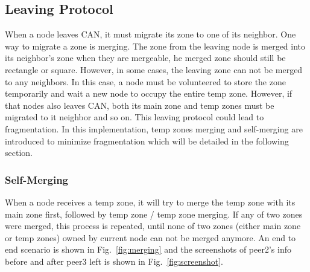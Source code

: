 \documentclass[11pt, oneside]{article}   	%
\begin{document}
\subsection{Leaving Protocol}
When a node leaves CAN, it must migrate its zone to one of its neighbor. One way to migrate a zone is merging. The zone from the leaving node is merged into its neighbor's zone when they are mergeable, he merged zone should still be rectangle or square. However, in some cases, the leaving zone can not be merged to any neighbors. In this case, a node must be volunteered to store the zone temporarily and wait a new node to occupy the entire temp zone. However, if that nodes also leaves CAN, both its main zone and temp zones must be migrated to it neighbor and so on. This leaving protocol could lead to fragmentation. In this implementation, temp zones merging and self-merging are introduced to minimize fragmentation which will be detailed in the following section.

\subsubsection{Self-Merging}
When a node receives a temp zone, it will try to merge the temp zone with its main zone first, followed by temp zone / temp zone merging. If any of two zones were merged, this process is repeated, until none of two zones (either main zone or temp zones) owned by current node can not be merged anymore. An end to end scenario is shown in Fig.~\ref{fig:merging} and the screenshots of peer2's info before and after peer3 left is shown in Fig.~\ref{fig:screenshot}.
\end{document}
